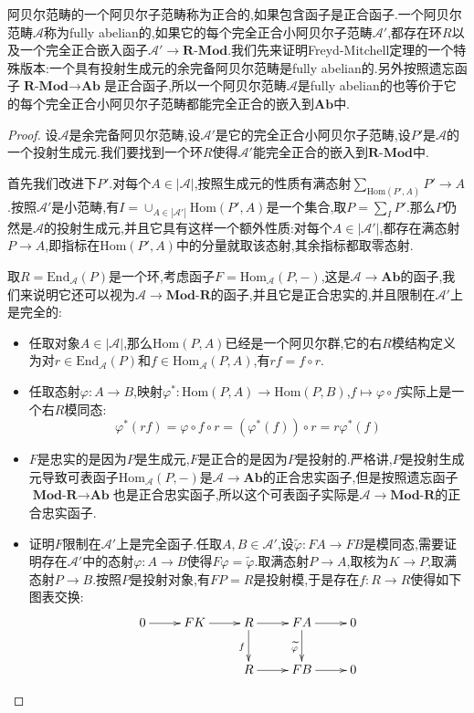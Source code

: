 阿贝尔范畴的一个阿贝尔子范畴称为正合的,如果包含函子是正合函子.一个阿贝尔范畴$\mathscr{A}$称为fully abelian的,如果它的每个完全正合小阿贝尔子范畴$\mathscr{A}'$,都存在环$R$以及一个完全正合嵌入函子$\mathscr{A}'\to\textbf{R-Mod}$.我们先来证明Freyd-Mitchell定理的一个特殊版本:一个具有投射生成元的余完备阿贝尔范畴是fully abelian的.另外按照遗忘函子$\textbf{R-Mod}\to\textbf{Ab}$是正合函子,所以一个阿贝尔范畴$\mathscr{A}$是fully abelian的也等价于它的每个完全正合小阿贝尔子范畴都能完全正合的嵌入到$\textbf{Ab}$中.
\begin{proof}
	
	设$\mathscr{A}$是余完备阿贝尔范畴,设$\mathscr{A}'$是它的完全正合小阿贝尔子范畴,设$P'$是$\mathscr{A}$的一个投射生成元.我们要找到一个环$R$使得$\mathscr{A}'$能完全正合的嵌入到$\textbf{R-Mod}$中.
	
	\qquad
	
	首先我们改进下$P'$.对每个$A\in|\mathscr{A}|$,按照生成元的性质有满态射$\sum_{\mathrm{Hom}(P',A)}P'\to A$.按照$\mathscr{A}'$是小范畴,有$I=\cup_{A\in|\mathscr{A}'|}\mathrm{Hom}(P',A)$是一个集合,取$P=\sum_IP'$.那么$P$仍然是$\mathscr{A}$的投射生成元,并且它具有这样一个额外性质:对每个$A\in|\mathscr{A}'|$,都存在满态射$P\to A$,即指标在$\mathrm{Hom}(P',A)$中的分量就取该态射,其余指标都取零态射.
	
	\qquad
	
	取$R=\mathrm{End}_{\mathscr{A}}(P)$是一个环,考虑函子$F=\mathrm{Hom}_{\mathscr{A}}(P,-)$,这是$\mathscr{A}\to\textbf{Ab}$的函子,我们来说明它还可以视为$\mathscr{A}\to\textbf{Mod-R}$的函子,并且它是正合忠实的,并且限制在$\mathscr{A}'$上是完全的:
	\begin{itemize}
		\item 任取对象$A\in|\mathscr{A}|$,那么$\mathrm{Hom}(P,A)$已经是一个阿贝尔群,它的右$R$模结构定义为对$r\in\mathrm{End}_{\mathscr{A}}(P)$和$f\in\mathrm{Hom}_{\mathscr{A}}(P,A)$,有$rf=f\circ r$.
		\item 任取态射$\varphi:A\to B$,映射$\varphi^*:\mathrm{Hom}(P,A)\to\mathrm{Hom}(P,B)$,$f\mapsto \varphi\circ f$实际上是一个右$R$模同态:
		$$\varphi^*(rf)=\varphi\circ f\circ r=(\varphi^*(f))\circ r=r\varphi^*(f)$$
		\item $F$是忠实的是因为$P$是生成元,$F$是正合的是因为$P$是投射的.严格讲,$P$是投射生成元导致可表函子$\mathrm{Hom}_{\mathscr{A}}(P,-)$是$\mathscr{A}\to\textbf{Ab}$的正合忠实函子,但是按照遗忘函子$\textbf{Mod-R}\to\textbf{Ab}$也是正合忠实函子,所以这个可表函子实际是$\mathscr{A}\to\textbf{Mod-R}$的正合忠实函子.
		\item 证明$F$限制在$\mathscr{A}'$上是完全函子.任取$A,B\in\mathscr{A}'$,设$\widetilde{\varphi}:FA\to FB$是模同态,需要证明存在$\mathscr{A}'$中的态射$\varphi:A\to B$使得$F\varphi=\widetilde{\varphi}$.取满态射$P\to A$,取核为$K\to P$,取满态射$P\to B$.按照$P$是投射对象,有$FP=R$是投射模,于是存在$f:R\to R$使得如下图表交换:
		$$\xymatrix{0\ar[r]&FK\ar[r]&R\ar[d]_f\ar[r]&FA\ar[d]_{\widetilde{\varphi}}\ar[r]&0\\&&R\ar[r]&FB\ar[r]&0}$$
		

\end{itemize}
\end{proof}

